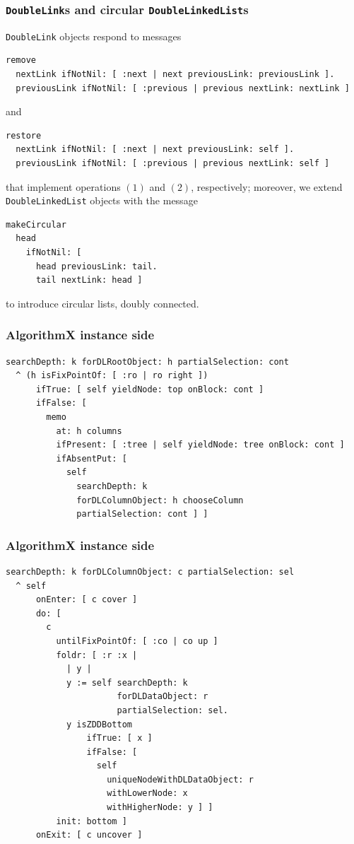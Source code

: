 \documentclass{beamer}
\begin{document}
\begin{frame}[fragile]
\frametitle{\texttt{DoubleLink}s and circular \texttt{DoubleLinkedList}s}
\texttt{DoubleLink} objects respond to messages
\begin{verbatim}
remove
  nextLink ifNotNil: [ :next | next previousLink: previousLink ].
  previousLink ifNotNil: [ :previous | previous nextLink: nextLink ]
\end{verbatim}
and
\begin{verbatim}
restore
  nextLink ifNotNil: [ :next | next previousLink: self ].
  previousLink ifNotNil: [ :previous | previous nextLink: self ]
\end{verbatim}
that implement operations $(1)$ and $(2)$, respectively;
moreover, we extend \texttt{DoubleLinkedList} objects with the message
\begin{verbatim}
makeCircular
  head
    ifNotNil: [ 
      head previousLink: tail.
      tail nextLink: head ]
\end{verbatim}
to introduce circular lists, doubly connected.
\end{frame}

\begin{frame}[fragile]
\frametitle{AlgorithmX instance side}
\begin{verbatim}
searchDepth: k forDLRootObject: h partialSelection: cont
  ^ (h isFixPointOf: [ :ro | ro right ])
      ifTrue: [ self yieldNode: top onBlock: cont ]
      ifFalse: [ 
        memo
          at: h columns
          ifPresent: [ :tree | self yieldNode: tree onBlock: cont ]
          ifAbsentPut: [ 
            self
              searchDepth: k
              forDLColumnObject: h chooseColumn
              partialSelection: cont ] ]
\end{verbatim}
\end{frame}

\begin{frame}[fragile]
\frametitle{AlgorithmX instance side}
\begin{verbatim}
searchDepth: k forDLColumnObject: c partialSelection: sel
  ^ self
      onEnter: [ c cover ]
      do: [ 
        c
          untilFixPointOf: [ :co | co up ]
          foldr: [ :r :x | 
            | y |
            y := self searchDepth: k 
                      forDLDataObject: r 
                      partialSelection: sel.
            y isZDDBottom
                ifTrue: [ x ]
                ifFalse: [ 
                  self
                    uniqueNodeWithDLDataObject: r
                    withLowerNode: x
                    withHigherNode: y ] ]
          init: bottom ]
      onExit: [ c uncover ]
\end{verbatim}
\end{frame}
\end{document}
